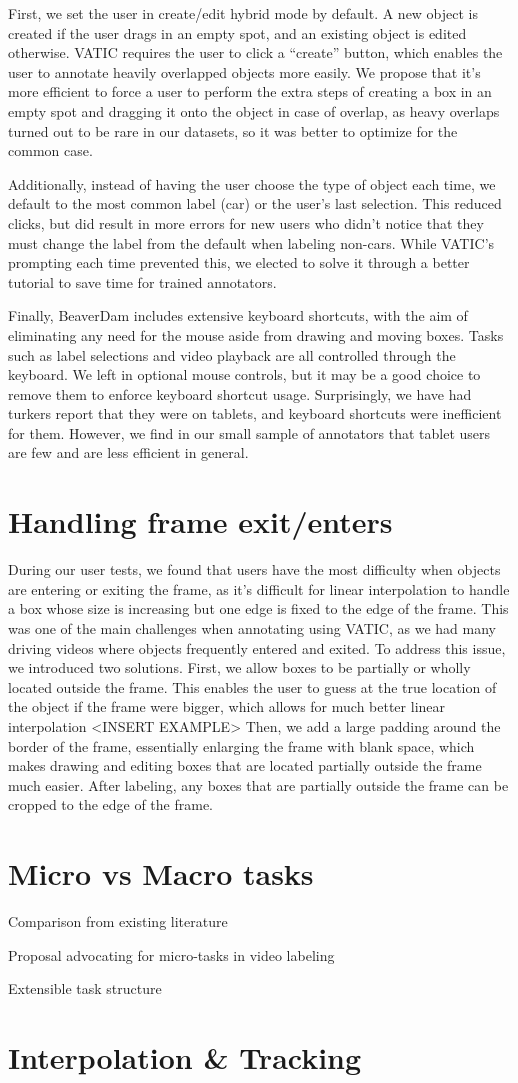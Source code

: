 First, we set the user in create/edit hybrid mode by default.
A new object is created if the user drags in an empty spot, and an existing object is edited otherwise.
VATIC requires the user to click a ``create'' button, which enables the user to annotate heavily overlapped objects more easily.
We propose that it's more efficient to force a user to perform the extra steps of creating a box in an empty spot and dragging it onto the object in case of overlap,
as heavy overlaps turned out to be rare in our datasets, so it was better to optimize for the common case.

Additionally, instead of having the user choose the type of object each time, we default to the most common label (car) or the user's last selection.
This reduced clicks, but did result in more errors for new users who didn't notice that they must change the label from the default when labeling non-cars.
While VATIC's prompting each time prevented this, we elected to solve it through a better tutorial to save time for trained annotators.

Finally, BeaverDam includes extensive keyboard shortcuts, with the aim of eliminating any need for the mouse aside from drawing and moving boxes. 
Tasks such as label selections and video playback are all controlled through the keyboard.
We left in optional mouse controls, but it may be a good choice to remove them to enforce keyboard shortcut usage.
Surprisingly, we have had turkers report that they were on tablets, and keyboard shortcuts were inefficient for them.
However, we find in our small sample of annotators that tablet users are few and are less efficient in general.

\section{Handling frame exit/enters}

During our user tests, we found that users have the most difficulty when objects are entering or exiting the frame, as it's difficult for linear interpolation to handle a box whose size is increasing but one edge is fixed to the edge of the frame. 
This was one of the main challenges when annotating using VATIC, as we had many driving videos where objects frequently entered and exited.
To address this issue, we introduced two solutions.
First, we allow boxes to be partially or wholly located outside the frame. 
This enables the user to guess at the true location of the object if the frame were bigger, which allows for much better linear interpolation <INSERT EXAMPLE>
Then, we add a large padding around the border of the frame, essentially enlarging the frame with blank space, which makes drawing and editing boxes that are located partially outside the frame much easier. 
After labeling, any boxes that are partially outside the frame can be cropped to the edge of the frame.

\section{Micro vs Macro tasks}

Comparison from existing literature

Proposal advocating for micro-tasks in video labeling

Extensible task structure

\section{Interpolation \& Tracking}
